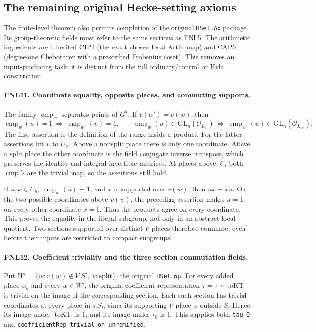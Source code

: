 \subsection{The remaining original Hecke-setting axioms}

The finite-level theorem also permits completion of the original
\texttt{HSet.Ax} package.  Its group-theoretic fields must refer to
the same sections as FNL5.  The arithmetic ingredients are inherited
CIP4 (the exact chosen local Artin map) and CAP6 (degree-one
Chebotarev with a prescribed Frobenius coset).  This removes an
input-producing task; it is distinct from the full ordinary/control
or Hida construction.

\paragraph{FNL11. Coordinate equality, opposite places, and commuting supports.}
\label{claim:FNL11}
The family \(\operatorname{cmp}_w\) separates points of \(G^a\).
If \(v(w')=v(w)\), then
\[
 \operatorname{cmp}_w(u)=1\ \Longrightarrow\
 \operatorname{cmp}_{w'}(u)=1,\qquad
 \operatorname{cmp}_w(u)\in\mathrm{GL}_n(\mathcal O_{L_w})
 \ \Longrightarrow\
 \operatorname{cmp}_{w'}(u)\in\mathrm{GL}_n(\mathcal O_{L_{w'}}).
\]
The first assertion is the definition of the range inside a product.
For the latter assertions lift \(u\) to \(U_{\mathbb A}\).
Above a nonsplit place there is only one coordinate.  Above a split
place the other coordinate is the field conjugate inverse transpose,
which preserves the identity and integral invertible matrices.
At places above \(\ell\), both \(\operatorname{cmp}\)'s are the
trivial map, so the assertions still hold.

If \(u,x\in U_b\), \(\operatorname{cmp}_w(u)=1\), and \(x\) is
supported over \(v(w)\), then \(ux=xu\).  On the two possible
coordinates above \(v(w)\), the preceding assertion makes \(u=1\);
on every other coordinate \(x=1\).  Thus the products agree on
every coordinate.  This proves the equality in the literal subgroup,
not only in an abstract local quotient.  Two sections supported over
distinct \(F\)-places therefore commute, even before their inputs
are restricted to compact subgroups.

\paragraph{FNL12. Coefficient triviality and the three section commutation fields.}
\label{claim:FNL12}
Put
\(W'=\{w:v(w)\notin V.S',\ w\text{ split}\}\), the original
\texttt{HSet.Wp}.  For every added place \(w_q\) and every
\(w\in W'\), the original coefficient representation
\(\tau=\tau_0\circ\operatorname{toKT}\) is trivial on the image of
the corresponding section.  Each such section has trivial coordinates
at every place in \(s.S_t\), since its supporting \(F\)-place is
outside \(S\).  Hence its image under \(\operatorname{toKT}\) is
\(1\), and its image under \(\tau_0\) is \(1\).
This supplies both \texttt{tau\_Q} and
\texttt{coefficientRep\_trivial\_on\_unramified}.

